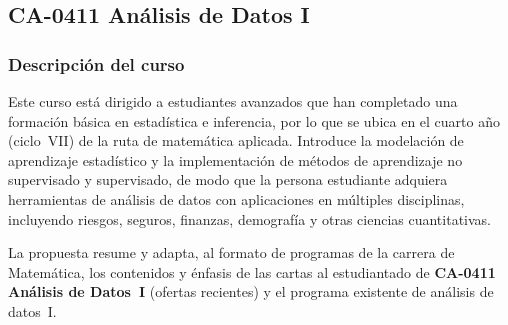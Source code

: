 \newpage
\subsection*{CA-0411 Análisis de Datos I}

\hypertarget{CA0411AnalisisDatosPropuesta}{}
\begin{refsection}
\begin{table}[H]
\end{table}

\subsubsection*{Descripción del curso}

Este curso está dirigido a estudiantes avanzados que han completado una formación básica en estadística e inferencia, por lo que se ubica en el cuarto año (ciclo~VII) de la ruta de matemática aplicada. Introduce la modelación de aprendizaje estadístico y la implementación de métodos de aprendizaje no supervisado y supervisado, de modo que la persona estudiante adquiera herramientas de análisis de datos con aplicaciones en múltiples disciplinas, incluyendo riesgos, seguros, finanzas, demografía y otras ciencias cuantitativas.

La propuesta resume y adapta, al formato de programas de la carrera de Matemática, los contenidos y énfasis de las cartas al estudiantado de \textbf{CA-0411 Análisis de Datos~I} (ofertas recientes) y el programa existente de análisis de datos~I.


\end{refsection}

